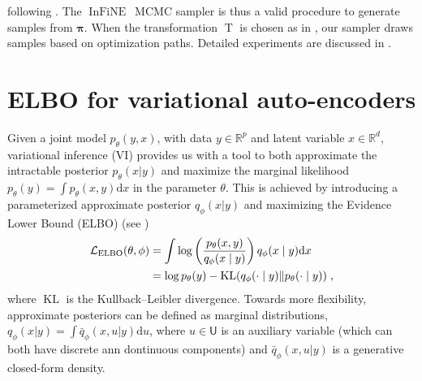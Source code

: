 \documentclass{article}
\def\IFIS{\ensuremath{\operatorname{InFiNE}}}
\def\transfo{\operatorname{T}}
\def\rmd{\operatorname{d}\hspace{-2pt}}
\def\rset{\mathbb{R}}
\def\rmd{\mathrm{d}}
\def\eqsp{\,}
\def\eqsp{\;}
\newcommand{\1}{\mathds{1}}
\def\measpi{\boldsymbol{\pi}}
\def\rset{\mathbb{R}}
\def\rmd{\mathrm{d}}
\begin{document}
following .
The \IFIS\  MCMC sampler is thus a valid procedure to generate samples from $\measpi$. When the transformation $\transfo$ is chosen as in , our sampler draws samples based on optimization paths. Detailed experiments are discussed in .



\section{ELBO for variational auto-encoders}
\label{sec:extensions}

Given a joint model $p_\theta(y, x)$, with data $y \in \rset^p$ and latent variable $x \in \rset^d$, variational inference (VI)
provides us with a tool to both approximate the intractable
posterior $p_\theta(x|y)$ and maximize the marginal likelihood
$p_\theta(y)= \int p_\theta(x,y) \rmd x$ in the parameter $\theta$. This is achieved by introducing a
parameterized approximate posterior $q_\phi(x|y)$ and maximizing
the Evidence Lower Bound (ELBO) (see \cite{kingma2019introduction})
\begin{align}\label{eq:elbo}
\mathcal{L}_{\textup{ELBO}}(\theta,\phi)&= \int \log\left(\frac{p_\theta(x,y)}{q_\phi(x\mid y)}\right) q_\phi(x\mid y)\rmd x \eqsp\\
&=\log p_\theta(y)-\operatorname{KL}(q_\phi(\cdot\mid y) \| p_\theta(\cdot\mid y) )\eqsp,\nonumber
\end{align}
where $\operatorname{KL}$ is the Kullback–Leibler divergence.
Towards more flexibility, approximate posteriors can be defined as marginal distributions, $q_\phi(x|y) = \int
\bar{q}_\phi (x, u |y) \rmd u$, where $u \in \mathsf{U}$ is an auxiliary variable (which can both have discrete ann dontinuous components) and $\bar{q}_\phi(x,u|y)$ is a generative closed-form density. 
\end{document}
